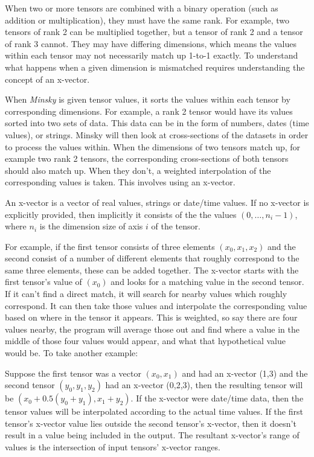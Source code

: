 When two or more tensors are combined with a binary operation (such
as addition or multiplication), they must have the same rank. For
example, two tensors of rank 2 can be multiplied together, but a tensor
of rank 2 and a tensor of rank 3 cannot. They may have differing dimensions,
which means the values within each tensor may not necessarily match
up 1-to-1 exactly. To understand what happens when a given dimension
is mismatched requires understanding the concept of an x-vector\label{x-vector}.

When \emph{Minsky} is given tensor values, it sorts the values within
each tensor by corresponding dimensions. For example, a rank 2 tensor
would have its values sorted into two sets of data. This data can
be in the form of numbers, dates (time values), or strings. Minsky
will then look at cross-sections of the datasets in order to process
the values within. When the dimensions of two tensors match up, for
example two rank 2 tensors, the corresponding cross-sections of both
tensors should also match up. When they don't, a weighted interpolation
of the corresponding values is taken. This involves using an x-vector.

An x-vector is a vector of real values, strings or date/time values.
If no x-vector is explicitly provided, then implicitly it consists
of the the values $(0,\ldots,n_{i}-1)$, where $n_{i}$ is the dimension
size of axis $i$ of the tensor.

For example, if the first tensor consists of three elements $(x_{0},x_{1},x_{2})$
and the second consist of a number of different elements that roughly
correspond to the same three elements, these can be added together.
The x-vector starts with the first tensor's value of $(x_{0})$ and
looks for a matching value in the second tensor. If it can't find
a direct match, it will search for nearby values which roughly correspond.
It can then take those values and interpolate the corresponding value
based on where in the tensor it appears. This is weighted, so say
there are four values nearby, the program will average those out and
find where a value in the middle of those four values would appear,
and what that hypothetical value would be. To take another example:

Suppose the first tensor was a vector $(x_{0},x_{1})$ and had an
x-vector (1,3) and the second tensor $(y_{0},y_{1},y_{2})$ had an
x-vector (0,2,3), then the resulting tensor will be $(x_{0}+0.5(y_{0}+y_{1}),x_{1}+y_{2})$.
If the x-vector were date/time data, then the tensor values will be
interpolated according to the actual time values. If the first tensor's
x-vector value lies outside the second tensor's x-vector, then it
doesn't result in a value being included in the output. The resultant
x-vector's range of values is the intersection of input tensors' x-vector
ranges.

